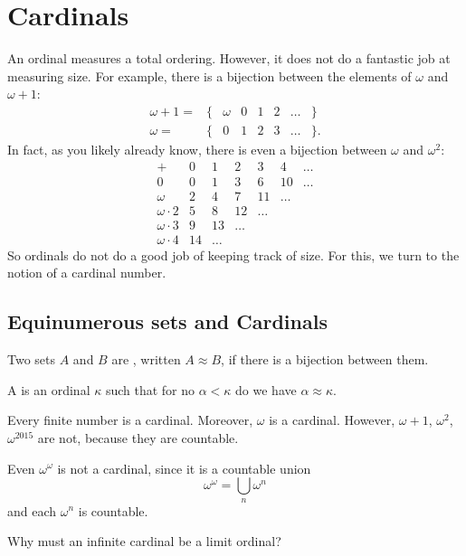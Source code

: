 \chapter{Cardinals}
An ordinal measures a total ordering.
However, it does not do a fantastic job at measuring size.
For example, there is a bijection between the elements of $\omega$ and $\omega+1$:
\[
	\begin{array}{rccccccc}
		\omega+1 = & \{ & \omega & 0 & 1 & 2 & \dots & \} \\
		\omega = & \{ & 0 & 1 & 2 & 3 & \dots & \}.
	\end{array}
\]
In fact, as you likely already know,
there is even a bijection between $\omega$ and $\omega^2$:
\[
	\begin{array}{l|cccccc}
		+ & 0 & 1 & 2 & 3 & 4 & \dots \\ \hline
		0 & 0 & 1 & 3 & 6 & 10 & \dots \\
		\omega & 2 & 4 & 7 & 11 & \dots & \\
		\omega \cdot 2 & 5 & 8 & 12 & \dots & & \\
		\omega \cdot 3 & 9 & 13 & \dots & & & \\
		\omega \cdot 4 & 14 & \dots & & & &
	\end{array}
\]
So ordinals do not do a good job of keeping track of size.
For this, we turn to the notion of a cardinal number.

\section{Equinumerous sets and Cardinals}
\begin{definition}
	Two sets $A$ and $B$ are , written $A \approx B$,
	if there is a bijection between them.
\end{definition}

\begin{definition}
	A  is an ordinal $\kappa$ such that
	for no $\alpha < \kappa$ do we have $\alpha \approx \kappa$.
\end{definition}
\begin{example}
	Every finite number is a cardinal.
	Moreover, $\omega$ is a cardinal.
	However, $\omega+1$, $\omega^2$, $\omega^{2015}$ are not,
	because they are countable.
\end{example}
\begin{example}
	Even $\omega^\omega$ is not a cardinal,
	since it is a countable union
	\[ \omega^\omega = \bigcup_n \omega^n \]
	and each $\omega^n$ is countable.
\end{example}
\begin{ques}
	Why must an infinite cardinal be a limit ordinal?
\end{ques}

